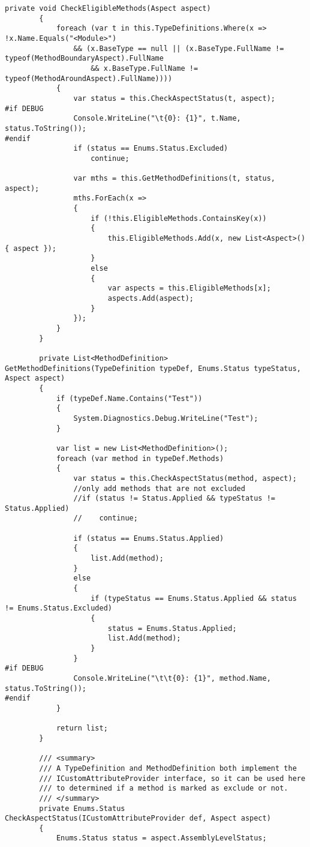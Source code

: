 \begin{lstlisting}[caption={../buffalo/Weaver.cs}, label=../buffalo/Weaver.cs, frame=tb, basicstyle=\scriptsize]
        private void CheckEligibleMethods(Aspect aspect)
        {
            foreach (var t in this.TypeDefinitions.Where(x => !x.Name.Equals("<Module>")
                && (x.BaseType == null || (x.BaseType.FullName != typeof(MethodBoundaryAspect).FullName
                    && x.BaseType.FullName != typeof(MethodAroundAspect).FullName))))
            {
                var status = this.CheckAspectStatus(t, aspect);
#if DEBUG
                Console.WriteLine("\t{0}: {1}", t.Name, status.ToString());
#endif
                if (status == Enums.Status.Excluded)
                    continue;

                var mths = this.GetMethodDefinitions(t, status, aspect);
                mths.ForEach(x =>
                {
                    if (!this.EligibleMethods.ContainsKey(x))
                    {
                        this.EligibleMethods.Add(x, new List<Aspect>() { aspect });
                    }
                    else
                    {
                        var aspects = this.EligibleMethods[x];
                        aspects.Add(aspect);
                    }
                });
            }
        }

        private List<MethodDefinition> GetMethodDefinitions(TypeDefinition typeDef, Enums.Status typeStatus, Aspect aspect)
        {
            if (typeDef.Name.Contains("Test"))
            {
                System.Diagnostics.Debug.WriteLine("Test");
            }

            var list = new List<MethodDefinition>();
            foreach (var method in typeDef.Methods)
            {
                var status = this.CheckAspectStatus(method, aspect);
                //only add methods that are not excluded
                //if (status != Status.Applied && typeStatus != Status.Applied)
                //    continue;

                if (status == Enums.Status.Applied)
                {
                    list.Add(method);
                }
                else
                {
                    if (typeStatus == Enums.Status.Applied && status != Enums.Status.Excluded)
                    {
                        status = Enums.Status.Applied;
                        list.Add(method);
                    }
                }
#if DEBUG
                Console.WriteLine("\t\t{0}: {1}", method.Name, status.ToString());
#endif
            }

            return list;
        }

        /// <summary>
        /// A TypeDefinition and MethodDefinition both implement the
        /// ICustomAttributeProvider interface, so it can be used here
        /// to determined if a method is marked as exclude or not.
        /// </summary>
        private Enums.Status CheckAspectStatus(ICustomAttributeProvider def, Aspect aspect)
        {
            Enums.Status status = aspect.AssemblyLevelStatus;


\end{lstlisting}
